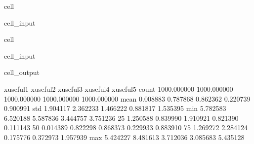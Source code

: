 \documentclass[letterpaper,10pt,english]{jupyterBook}
\begin{document}
\begin{sphinxuseclass}{cell}
\begin{sphinxVerbatimInput}
\begin{sphinxuseclass}{cell_input}
\begin{sphinxVerbatim}[commandchars=\\\{\}]
  

  
\end{sphinxVerbatim}

\end{sphinxuseclass}\end{sphinxVerbatimInput}

\end{sphinxuseclass}
\begin{sphinxuseclass}{cell}\begin{sphinxVerbatimInput}

\begin{sphinxuseclass}{cell_input}
\begin{sphinxVerbatim}[commandchars=\\\{\}]
\end{sphinxVerbatim}

\end{sphinxuseclass}\end{sphinxVerbatimInput}
\begin{sphinxVerbatimOutput}

\begin{sphinxuseclass}{cell_output}
\begin{sphinxVerbatim}[commandchars=\\\{\}]
        x\PYGZus{}useful\PYGZus{}1   x\PYGZus{}useful\PYGZus{}2   x\PYGZus{}useful\PYGZus{}3   x\PYGZus{}useful\PYGZus{}4   x\PYGZus{}useful\PYGZus{}5  \PYGZbs{}
count  1000.000000  1000.000000  1000.000000  1000.000000  1000.000000   
mean      0.008883     0.787868    \PYGZhy{}0.862362    \PYGZhy{}0.220739     0.900991   
std       1.904117     2.362233     1.466222     0.881817     1.535395   
min      \PYGZhy{}5.782583    \PYGZhy{}6.520188    \PYGZhy{}5.587836    \PYGZhy{}3.444757    \PYGZhy{}3.751236   
25\PYGZpc{}      \PYGZhy{}1.250588    \PYGZhy{}0.839990    \PYGZhy{}1.910921    \PYGZhy{}0.821390    \PYGZhy{}0.111143   
50\PYGZpc{}      \PYGZhy{}0.014389     0.822298    \PYGZhy{}0.868373    \PYGZhy{}0.229933     0.883910   
75\PYGZpc{}       1.269272     2.284124     0.175776     0.372973     1.957939   
max       5.424227     8.481613     3.712036     3.085683     5.435128   


\end{sphinxVerbatim}
\end{sphinxuseclass}
\end{sphinxVerbatimOutput}
\end{sphinxuseclass}
\end{document}
